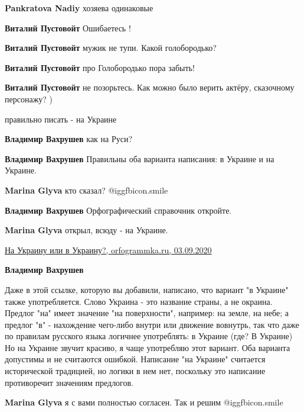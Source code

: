 \begin{itemize}
\begin{itemize}
\textbf{Pankratova Nadiy} хозяева одинаковые

\textbf{Виталий Пустовойт} Ошибаетесь !

\textbf{Виталий Пустовойт} мужик не тупи. Какой голобородько?

\textbf{Виталий Пустовойт} про Голобородько пора забыть!

\textbf{Виталий Пустовойт} не позорьтесь. Как можно было верить актёру, сказочному персонажу? )
\end{itemize} %

правильно писать - на Украине

\begin{itemize} %
\textbf{Владимир Вахрушев} как на Руси?

\textbf{Владимир Вахрушев} Правильны оба варианта написания: в Украине и на Украине.

\textbf{Marina Glyva} кто сказал? @igg{fbicon.smile} 

\textbf{Владимир Вахрушев} Орфографический справочник откройте.

\textbf{Marina Glyva} открыл, всюду - на Украине.

\href{https://orfogrammka.ru/блог/интересное/на-украину-или-в-украину/}{%
На Украину или в Украину?, orfogrammka.ru, 03.09.2020%
}

\textbf{Владимир Вахрушев} 

Даже в этой ссылке, которую вы добавили, написано, что вариант "в Украине"
также употребляется. Слово Украина - это название страны, а не окраина. Предлог
"на" имеет значение "на поверхности", например: на земле, на небе; а предлог
"в" - нахождение чего-либо внутри или движение вовнутрь, так что даже по
правилам русского языка логичнее употреблять: в Украине (где? В Украине) Но на
Украине звучит красиво, я чаще употребляю этот вариант. Оба варианта допустимы
и не считаются ошибкой. Написание "на Украине" считается исторической
традицией, но логики в нем нет, поскольку это написание противоречит значениям
предлогов.

\textbf{Marina Glyva} я с вами полностью согласен. Так и решим @igg{fbicon.smile} 

\end{itemize} %


\end{itemize}
